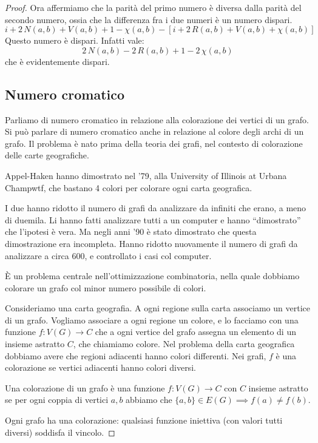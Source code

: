 \begin{proof}
	Ora affermiamo che la parit\`a del primo numero \`e diversa dalla parit\`a del secondo numero, ossia che la differenza fra i due numeri \`e un numero dispari.
	\[
		i + 2 \, N(a,b) + V(a,b) + 1 - \chi(a,b) - \left[ i + 2 \, R(a,b) + V(a,b) + \chi (a,b) \right]
	\]
	Questo numero \`e dispari.
	Infatti vale:
	\[
		2 \, N(a,b) - 2 \, R(a,b) + 1 - 2 \, \chi(a,b)
	\]
	che \`e evidentemente dispari.

	\subsection{Numero cromatico}

	Parliamo di numero cromatico in relazione alla colorazione dei vertici di un grafo.
	Si pu\`o parlare di numero cromatico anche in relazione al colore degli archi di un grafo.
	Il problema \`e nato prima della teoria dei grafi, nel contesto di colorazione delle carte geografiche.

	Appel-Haken hanno dimostrato nel '79, alla University of Illinois at Urbana Champwtf, che bastano 4 colori per colorare ogni carta geografica.

	I due hanno ridotto il numero di grafi da analizzare da infiniti che erano, a meno di duemila.
	Li hanno fatti analizzare tutti a un computer e hanno ``dimostrato'' che l'ipotesi \`e vera.
	Ma negli anni '90 \`e stato dimostrato che questa dimostrazione era incompleta.
	Hanno ridotto nuovamente il numero di grafi da analizzare a circa 600, e controllato i casi col computer.

	\`E un problema centrale nell'ottimizzazione combinatoria, nella quale dobbiamo colorare un grafo col minor numero possibile di colori.

	Consideriamo una carta geografia.
	A ogni regione sulla carta associamo un vertice di un grafo.
	Vogliamo associare a ogni regione un colore, e lo facciamo con una funzione $f: V(G) \to C$ che a ogni vertice del grafo assegna un elemento di un insieme astratto $C$, che chiamiamo colore.
	Nel problema della carta geografica dobbiamo avere che regioni adiacenti hanno colori differenti.
	Nei grafi, $f$ \`e una colorazione se vertici adiacenti hanno colori diversi.

	\begin{defn}
		Una colorazione di un grafo \`e una funzione $f : V(G) \to C$ con $C$ insieme astratto se per ogni coppia di vertici $a,b$ abbiamo che $\{a,b\} \in E(G) \implies f(a) \neq f(b)$.
	\end{defn}
	Ogni grafo ha una colorazione: qualsiasi funzione iniettiva (con valori tutti diversi) soddisfa il vincolo.


\end{proof}
